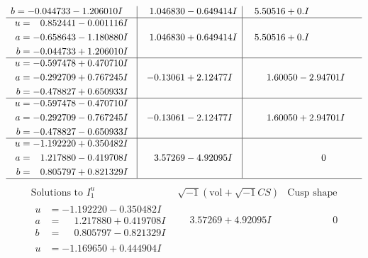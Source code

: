 \documentclass[1p]{elsarticle_modified}
\theoremstyle{definition}
\newcommand{\I}{\sqrt{-1}}
\begin{document}
$$\begin{array}{c|c|c}
\begin{aligned}
b &= -0.044733 - 1.206010 I\end{aligned}
 & \phantom{-}1.046830 - 0.649414 I & \phantom{-}5.50516 + 0. I\phantom{ +0.000000I} \\ \hline\begin{aligned}
u &= \phantom{-}0.852441 - 0.001116 I \\
a &= -0.658643 - 1.180880 I \\
b &= -0.044733 + 1.206010 I\end{aligned}
 & \phantom{-}1.046830 + 0.649414 I & \phantom{-}5.50516 + 0. I\phantom{ +0.000000I} \\ \hline\begin{aligned}
u &= -0.597478 + 0.470710 I \\
a &= -0.292709 + 0.767245 I \\
b &= -0.478827 + 0.650933 I\end{aligned}
 & -0.13061 + 2.12477 I & \phantom{-}1.60050 - 2.94701 I \\ \hline\begin{aligned}
u &= -0.597478 - 0.470710 I \\
a &= -0.292709 - 0.767245 I \\
b &= -0.478827 - 0.650933 I\end{aligned}
 & -0.13061 - 2.12477 I & \phantom{-}1.60050 + 2.94701 I \\ \hline\begin{aligned}
u &= -1.192220 + 0.350482 I \\
a &= \phantom{-}1.217880 - 0.419708 I \\
b &= \phantom{-}0.805797 + 0.821329 I\end{aligned}
 & \phantom{-}3.57269 - 4.92095 I & \phantom{-0.000000 } 0\\
 \hline 
 \end{array}$$\newpage$$\begin{array}{c|c|c}  
\text{Solutions to }I^u_{1}& \I (\text{vol} + \sqrt{-1}CS) & \text{Cusp shape}\\
 \hline 
\begin{aligned}
u &= -1.192220 - 0.350482 I \\
a &= \phantom{-}1.217880 + 0.419708 I \\
b &= \phantom{-}0.805797 - 0.821329 I\end{aligned}
 & \phantom{-}3.57269 + 4.92095 I & \phantom{-0.000000 } 0 \\ \hline\begin{aligned}
u &= -1.169650 + 0.444904 I \\

\end{aligned}
\end{array}$$
\end{document}
